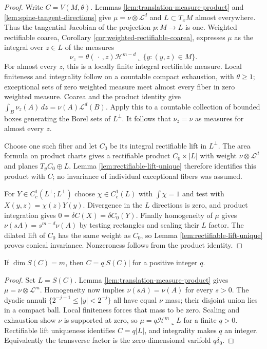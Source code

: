 \begin{proof}
Write $C=V(M,\theta)$. Lemmas \ref{lem:translation-measure-product} and \ref{lem:spine-tangent-directions} give $\mu=\nu\otimes\mathcal L^d$ and $L\subset T_xM$ almost everywhere. Thus the tangential Jacobian of the projection $p:M\to L$ is one. Weighted rectifiable coarea, Corollary \ref{cor:weighted-rectifiable-coarea}, expresses $\mu$ as the integral over $z\in L$ of the measures
\[
 \nu_z=\theta(\,\cdot\,,z)\mathcal H^{m-d}\llcorner\{y:(y,z)\in M\}.
\]
For almost every $z$, this is a locally finite integral rectifiable measure. Local finiteness and integrality follow on a countable compact exhaustion, with $\theta\geq1$; exceptional sets of zero weighted measure meet almost every fiber in zero weighted measure. Coarea and the product identity give $\int_B\nu_z(A)\,dz=\nu(A)\mathcal L^d(B)$. Apply this to a countable collection of bounded boxes generating the Borel sets of $L^\perp$. It follows that $\nu_z=\nu$ as measures for almost every $z$.

Choose one such fiber and let $C_0$ be its integral rectifiable lift in $L^\perp$. The area formula on product charts gives a rectifiable product $C_0\times|L|$ with weight $\nu\otimes\mathcal L^d$ and planes $T_yC_0\oplus L$. Lemma \ref{lem:rectifiable-lift-unique} therefore identifies this product with $C$; no invariance of individual exceptional fibers was assumed.

For $Y\in C_c^1(L^\perp;L^\perp)$ choose $\chi\in C_c^1(L)$ with $\int\chi=1$ and test with $X(y,z)=\chi(z)Y(y)$. Divergence in the $L$ directions is zero, and product integration gives $0=\delta C(X)=\delta C_0(Y)$. Finally homogeneity of $\mu$ gives $\nu(sA)=s^{m-d}\nu(A)$ by testing rectangles and scaling their $L$ factor. The dilated lift of $C_0$ has the same weight as $C_0$, so Lemma \ref{lem:rectifiable-lift-unique} proves conical invariance. Nonzeroness follows from the product identity.
\end{proof}

\begin{corollary}\label{cor:full-spine-plane}
If $\dim S(C)=m$, then $C=q|S(C)|$ for a positive integer $q$.
\end{corollary}
\begin{proof}
Set $L=S(C)$. Lemma \ref{lem:translation-measure-product} gives $\mu=\nu\otimes\mathcal L^m$. Homogeneity now implies $\nu(sA)=\nu(A)$ for every $s>0$. The dyadic annuli $\{2^{-j-1}\leq|y|<2^{-j}\}$ all have equal $\nu$ mass; their disjoint union lies in a compact ball. Local finiteness forces that mass to be zero. Scaling and exhaustion show $\nu$ is supported at zero, so $\mu=q\mathcal H^m\llcorner L$ for a finite $q>0$. Rectifiable lift uniqueness identifies $C=q|L|$, and integrality makes $q$ an integer. Equivalently the transverse factor is the zero-dimensional varifold $q\delta_0$.
\end{proof}
